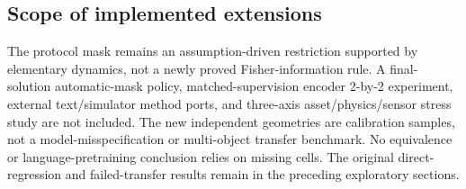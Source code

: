 \subsection{Scope of implemented extensions}
The protocol mask remains an assumption-driven restriction supported by elementary dynamics, not a newly proved Fisher-information rule. A final-solution automatic-mask policy, matched-supervision encoder 2-by-2 experiment, external text/simulator method ports, and three-axis asset/physics/sensor stress study are not included. The new independent geometries are calibration samples, not a model-misspecification or multi-object transfer benchmark. No equivalence or language-pretraining conclusion relies on missing cells. The original direct-regression and failed-transfer results remain in the preceding exploratory sections.
